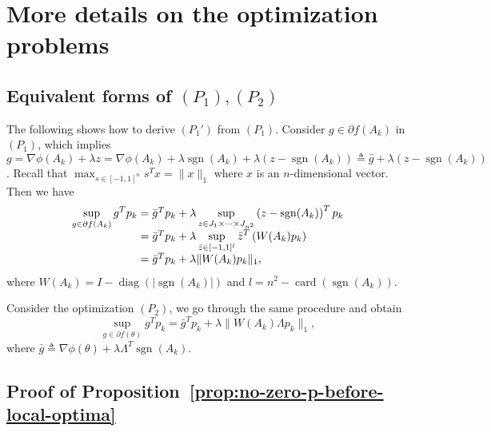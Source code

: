 \documentclass[letterpaper,10pt,journal,final]{IEEEtran}
\theoremstyle{definition}
\theoremstyle{remark}
\newcommand{\diag}{\operatorname{diag}}
\newcommand{\sgn}{\operatorname{sgn}}
\begin{document}
\section{More details on the optimization problems}
\label{appdix:derivation-Pprim-P}

\subsection{Equivalent forms of $(P_1), (P_2)$}
\label{appdix:subsec:equivalent-forms-P1-P2}

The following shows how to derive $(P_1')$ from $(P_1)$. Consider $g
\in \partial f(A_k)$ in $(P_1)$, which implies $g = \nabla \phi(A_k) + \lambda z =
\nabla \phi(A_k) + \lambda \sgn(A_k) + \lambda(z - \sgn(A_k)) \triangleq \bar{g} +
\lambda(z-\sgn(A_k))$. Recall that $\max_{s \in [-1,1]^n} s^T x = \|x\|_1$ where $x$
is an $n$-dimensional vector. Then we have
\begin{equation*}
  \begin{array}{l@{\;}l}
    \displaystyle\sup_{g \in \partial f(A_k)} g^T p_k
    &= \bar{g}^T p_k + \lambda \displaystyle\sup_{z \in J_1 \times \cdots \times J_{n^2}} \left( z - \sgn(A_k) \right)^T p_k \\
    &= \bar{g}^T p_k + \lambda \displaystyle\sup_{\bar{z} \in [-1,1]^l} \bar{z}^T
      \left( W(A_k)p_k \right) \\
    &= \bar{g}^T p_k + \lambda \|W(A_k)p_k\|_1,
  \end{array}
\end{equation*}
where $W(A_k) = I - \diag(|\sgn(A_k)|)$ and $l = n^2 - \operatorname{card}(\sgn(A_k))$.

Consider the optimization $(P_2)$, we go through the same procedure and obtain
\begin{equation*}
  \sup_{g \in \partial f(\theta)} g^T p_k = \bar{g}^T p_k + \lambda \|W(A_k) \Lambda p_k\|_1,
\end{equation*}
where $\bar{g} \triangleq \nabla\phi(\theta) + \lambda \Lambda^T \sgn(A_k)$.

\subsection{Proof of Proposition~\ref{prop:no-zero-p-before-local-optima}}
\label{appdix:subsec:proofs-proposition-nonzero}
\end{document}
